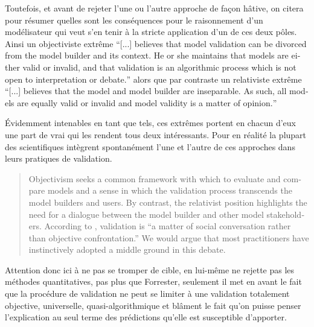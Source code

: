 

Toutefois, et avant de rejeter l'une ou l'autre approche de façon hâtive, on citera \textcite{Kleindorfer1998} pour résumer quelles sont les conséquences pour le raisonnement d'un modélisateur qui veut s'en tenir à la stricte application d'un de ces deux pôles. Ainsi un objectiviste extrême \foreignquote{english}{[...] believes that model validation can be divorced from the model builder and its context. He or she maintains that models are either valid or invalid, and that validation is an algorithmic process which is not open to interpretation or debate.} alors que par contraste un relativiste extrême \foreignquote{english}{[...] believes that the model and model builder are inseparable. As such, all models are equally valid or invalid and model validity is a matter of opinion.}

Évidemment intenables en tant que tels, ces extrêmes portent en chacun d'eux une part de vrai qui les rendent tous deux intéressants. Pour \textcite{Kleindorfer1998} en réalité la plupart des scientifiques intègrent spontanément l'une et l'autre de ces approches dans leurs pratiques de validation.

\foreignblockquote{english}[{\cite[1098]{Kleindorfer1998}}]{Objectivism seeks a common framework with which to evaluate and compare models and a sense in which the validation process transcends the model builders and users. By contrast, the relativist position highlights the need for a dialogue between the model builder and other model stakeholders. According to \autocite{Barlas1990}, validation is \enquote{a matter of social conversation rather than objective confrontation.} We would argue that most practitioners have instinctively adopted a middle ground in this debate.}

Attention donc ici à ne pas se tromper de cible, \textcite[188]{Barlas1996} en lui-même ne rejette pas les méthodes quantitatives, pas plus que Forrester, seulement il met en avant le fait que la procédure de validation ne peut se limiter à une validation totalement objective, universelle, quasi-algorithmique et blâment le fait qu'on puisse penser l'explication au seul terme des prédictions qu'elle est susceptible d'apporter.


